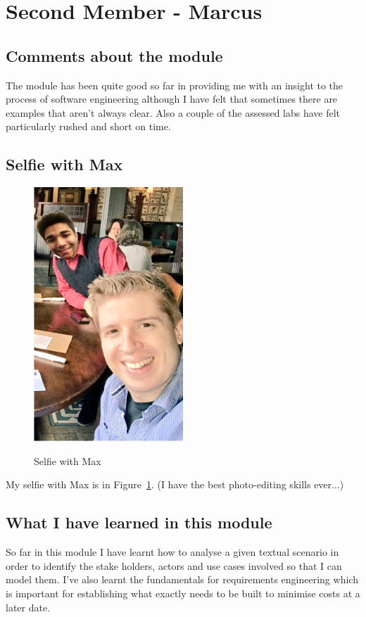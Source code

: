 \section{Second Member - Marcus}
\subsection{Comments about the module}
The module has been quite good so far in providing me with an insight to the process of software engineering although I have felt that sometimes there are examples that aren't always clear. Also a couple of the assessed labs have felt particularly rushed and short on time.

\subsection{Selfie with Max}

\begin{figure}[h]
\caption{Selfie with Max}
\centering
\includegraphics[width=0.5\textwidth]{editedmarcusmaxselfie.png}
\label{fig:selfie}
\end{figure}

My selfie with Max is in  Figure~\ref{fig:selfie}. (I have the best photo-editing skills ever...)

\subsection{What I have learned in this module}
So far in this module I have learnt how to analyse a given textual scenario in order to identify the stake holders, actors and use cases involved so that I can model them. I've also learnt the fundamentals for requirements engineering which is important for establishing what exactly needs to be built to minimise costs at a later date.

